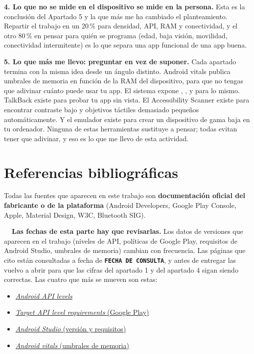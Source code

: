 \textbf{4. Lo que no se mide en el dispositivo se mide en la persona.} Esta es la conclusión del Apartado 5 y la que más me ha cambiado el planteamiento. Repartir el trabajo en un 20\,\% para densidad, API, RAM y conectividad, y el otro 80\,\% en pensar para quién se programa (edad, baja visión, movilidad, conectividad intermitente) es lo que separa una app funcional de una app buena.

\textbf{5. Lo que más me llevo: preguntar en vez de suponer.} Cada apartado termina con la misma idea desde un ángulo distinto. Android vitals publica umbrales de memoria en función de la RAM del dispositivo, para que no tengas que adivinar cuánto puede usar tu app. El sistema expone , ,  y  para lo mismo. TalkBack existe para probar tu app sin vista. El Accessibility Scanner existe para encontrar contraste bajo y objetivos táctiles demasiado pequeños automáticamente. Y el emulador existe para crear un dispositivo de gama baja en tu ordenador. Ninguna de estas herramientas sustituye a pensar; todas evitan tener que adivinar, y eso es lo que me llevo de esta actividad.%
\newpage
\section*{Referencias bibliográficas}

Todas las fuentes que aparecen en este trabajo son \textbf{documentación oficial del fabricante o de la plataforma} (Android Developers, Google Play Console, Apple, Material Design, W3C, Bluetooth SIG).
\begin{warnbox}
\textbf{\color{accent!80!black}\faExclamationTriangle\ \ Las fechas de esta parte hay que revisarlas.}
Los datos de versiones que aparecen en el trabajo (niveles de API, políticas de Google Play,
requisitos de Android Studio, umbrales de memoria) cambian con frecuencia. Las páginas que cito
están consultadas a fecha de \textbf{\texttt{FECHA DE CONSULTA}}, y antes de entregar las vuelvo
a abrir para que las cifras del apartado 1 y del apartado 4 sigan siendo correctas. Las cuatro que
más se mueven son estas:
\begin{itemize}[leftmargin=*,itemsep=0.15em,topsep=0.2em]
  \item \href{https://developer.android.com/tools/releases/platforms}{\emph{Android API levels}}
  \item \href{https://support.google.com/googleplay/android-developer/answer/11926878}{\emph{Target API level requirements} (Google Play)}
  \item \href{https://developer.android.com/studio}{\emph{Android Studio} (versión y requisitos)}
  \item \href{https://developer.android.com/topic/performance/vitals}{\emph{Android vitals} (umbrales de memoria)}
\end{itemize}
\end{warnbox}
